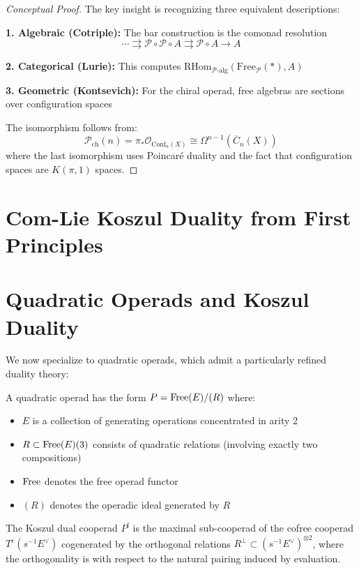 \begin{proof}[Conceptual Proof]
The key insight is recognizing three equivalent descriptions:

\textbf{1. Algebraic (Cotriple):} The bar construction is the comonad resolution
$$\cdots \rightrightarrows \mathcal{P} \circ \mathcal{P} \circ A \rightrightarrows \mathcal{P} \circ A \to A$$

\textbf{2. Categorical (Lurie):} This computes $\text{RHom}_{\mathcal{P}\text{-alg}}(\text{Free}_{\mathcal{P}}(\ast), A)$

\textbf{3. Geometric (Kontsevich):} For the chiral operad, free algebras are sections over configuration spaces

The isomorphism follows from:
$$\mathcal{P}_{\text{ch}}(n) = \pi_*\mathcal{O}_{\text{Conf}_n(X)} \cong \Omega^{n-1}(\overline{C}_n(X))$$
where the last isomorphism uses Poincaré duality and the fact that configuration spaces are $K(\pi,1)$ spaces.
\end{proof}

\section{Com-Lie Koszul Duality from First Principles}
 
\section{Quadratic Operads and Koszul Duality}
 
We now specialize to quadratic operads, which admit a particularly refined duality theory:
 
\begin{definition}
A quadratic operad has the form $P = \operatorname{Free}(E)/(R)$ where:
\begin{itemize}
\item $E$ is a collection of generating operations concentrated in arity 2
\item $R \subset \operatorname{Free}(E)(3)$ consists of quadratic relations (involving exactly two compositions)
\item $\operatorname{Free}$ denotes the free operad functor
\item $(R)$ denotes the operadic ideal generated by $R$
\end{itemize}
\end{definition}
 
\begin{definition}
The Koszul dual cooperad $P^!$ is the maximal sub-cooperad of the cofree cooperad $T^c(s^{-1}E^\vee)$ cogenerated by the orthogonal relations $R^\perp \subset (s^{-1}E^\vee)^{\otimes 2}$, where the orthogonality is with respect to the natural pairing induced by evaluation.
\end{definition}
 
